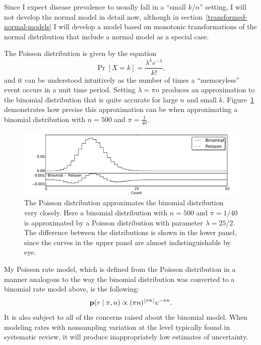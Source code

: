 Since I expect disease prevalence to usually fall in a ``small $k/n$''
setting, I will not develop the normal model in detail now, although
in section~\ref{transformed-normal-models} I will develop a model based on monotonic
transformations of the normal distribution that include a normal
model as a special case.

The Poisson distribution is given by the equation
\[
\Pr[X=k] =
\frac{\lambda^k e^{-\lambda}}{k!},
\]
and it can be understood intuitively as the number of times a
``memoryless'' event occurs in a unit time period.  Setting $\lambda
=\pi n$ produces an approximation to the binomial distribution that
is quite accurate for large $n$ and small
$k$. Figure~\ref{rate-model-poisson-approx-to-binom} demonstrates how
precise this approximation can be when approximating a binomial
distribution with $n=500$ and $\pi=\frac{1}{40}$.

\begin{figure}[h]
\begin{center}
\includegraphics[width=\textwidth]{poisson_approx_to_binom.pdf}
\end{center}
\caption{The Poisson distribution approximates the binomial
  distribution very closely. Here a binomial distribution with $n=500$
  and $\pi=1/40$ is approximated by a Poisson distribution
  with parameter $\lambda=25/2$.  The difference between the
  distributions is shown in the lower panel, since the curves in the
  upper panel are almost indistinguishable by eye.}
\label{rate-model-poisson-approx-to-binom}
\end{figure}

My Poisson rate model, which is defined from the Poisson distribution
in a manner analogous to the way the binomial distribution was
converted to a binomial rate model above, is the following:
\[
\mathbf{p}(r\;|\; \pi,n) \propto
(\pi n)^{\lfloor
  rn\rfloor} e^{-\pi n}.
\]
It is also subject to all of the concerns raised about the binomial
model.  When modeling rates with nonsampling variation at the level
typically found in systematic review, it will produce
inappropriately low estimates of uncertainty.

